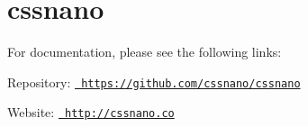 \chapter{cssnano}
\hypertarget{md_pkiclassroomrescheduler_2src_2main_2frontend_2node__modules_2cssnano_2_r_e_a_d_m_e}{}\label{md_pkiclassroomrescheduler_2src_2main_2frontend_2node__modules_2cssnano_2_r_e_a_d_m_e}
\label{md_pkiclassroomrescheduler_2src_2main_2frontend_2node__modules_2cssnano_2_r_e_a_d_m_e_autotoc_md8135}%
%
 For documentation, please see the following links\+:


\begin{DoxyItemize}
\item Repository\+: \href{https://github.com/cssnano/cssnano}{\texttt{ https\+://github.\+com/cssnano/cssnano}}
\item Website\+: \href{http://cssnano.co}{\texttt{ http\+://cssnano.\+co}} 
\end{DoxyItemize}